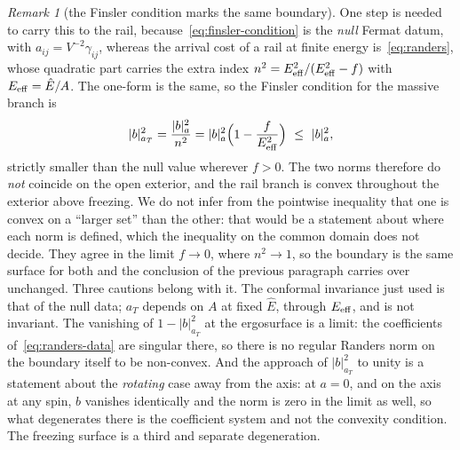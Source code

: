 \documentclass[12pt]{iopart}
\theoremstyle{plain}
\theoremstyle{definition}
\theoremstyle{remark}
\newtheorem{remark}[proposition]{Remark}
\newcommand{\Ehat}{\hat E}
\begin{document}
\begin{remark}[the Finsler condition marks the same boundary]
One step is needed to carry this to the rail, because~\eqref{eq:finsler-condition}
is the \emph{null} Fermat datum, with $a_{ij}=V^{-2}\gamma_{ij}$, whereas the
arrival cost of a rail at finite energy is~\eqref{eq:randers}, whose quadratic part
carries the extra index $n^2=E_{\rm eff}^2/(E_{\rm eff}^2-f)$ with $E_{\rm eff}=\Ehat/A$. The one-form is the
same, so the Finsler condition for the massive branch is
\begin{equation}
    |b|^2_{a_T}=\frac{|b|^2_a}{n^2}=|b|^2_a\Big(1-\frac{f}{E_{\rm eff}^2}\Big)
    \ \le\ |b|^2_a ,
    \label{eq:finsler-massive}
\end{equation}
strictly smaller than the null value wherever $f>0$. The two norms therefore do
\emph{not} coincide on the open exterior, and the rail branch is convex
throughout the exterior above freezing. We do not infer from the pointwise
inequality that one is convex on a ``larger set'' than the other: that would be a
statement about where each norm is defined, which the inequality on the common
domain does not decide. They agree in the limit
$f\to0$, where $n^2\to1$, so the boundary is the same surface for
both and the conclusion of the previous paragraph carries over unchanged. Three
cautions belong with it. The conformal invariance just used is that of the null
data; $a_T$ depends on $A$ at fixed $\Ehat$, through $E_{\rm eff}$, and is not invariant.
The vanishing of $1-|b|^2_{a_T}$ at the ergosurface is a limit: the coefficients
of~\eqref{eq:randers-data} are singular there, so there is no regular Randers norm
on the boundary itself to be non-convex. And the approach of $|b|^2_{a_T}$ to
unity is a statement about the \emph{rotating} case away from the axis: at $a=0$,
and on the axis at any spin, $b$ vanishes identically and the norm is zero in the
limit as well, so what degenerates there is the coefficient system and not the
convexity condition. The freezing surface is a third and separate degeneration.


\end{remark}
\end{document}
